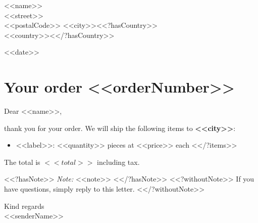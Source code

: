 \documentclass[11pt]{article}
\newcommand{\field}[1]{\textbf{#1}}
\begin{document}
<<name>>\\
<<street>>\\
<<postalCode>> <<city>><<?hasCountry>>\\<<country>><</?hasCountry>>

\bigskip
<<date>>

\section*{Your order <<orderNumber>>}

Dear <<name>>,

thank you for your order. We will ship the following items to \field{<<city>>}:
\begin{itemize}
<<?items>>  \item <<label>>: <<quantity>> pieces at <<price>> each
<</?items>>\end{itemize}
The total is $ <<total>> $ including tax.

<<?hasNote>>
\emph{Note:} <<note>>
<</?hasNote>>
<<?withoutNote>>
If you have questions, simply reply to this letter.
<</?withoutNote>>

Kind regards\\
<<senderName>>
\end{document}
